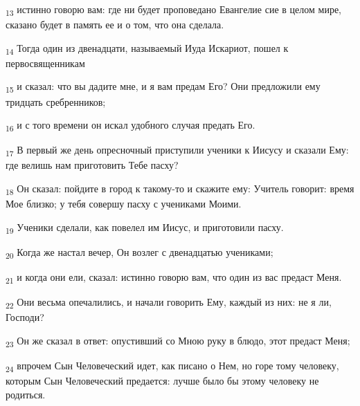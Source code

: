 \begin{tcolorbox}
\textsubscript{13} истинно говорю вам: где ни будет проповедано Евангелие сие в целом мире, сказано будет в память ее и о том, что она сделала.
\end{tcolorbox}
\begin{tcolorbox}
\textsubscript{14} Тогда один из двенадцати, называемый Иуда Искариот, пошел к первосвященникам
\end{tcolorbox}
\begin{tcolorbox}
\textsubscript{15} и сказал: что вы дадите мне, и я вам предам Его? Они предложили ему тридцать сребренников;
\end{tcolorbox}
\begin{tcolorbox}
\textsubscript{16} и с того времени он искал удобного случая предать Его.
\end{tcolorbox}
\begin{tcolorbox}
\textsubscript{17} В первый же день опресночный приступили ученики к Иисусу и сказали Ему: где велишь нам приготовить Тебе пасху?
\end{tcolorbox}
\begin{tcolorbox}
\textsubscript{18} Он сказал: пойдите в город к такому-то и скажите ему: Учитель говорит: время Мое близко; у тебя совершу пасху с учениками Моими.
\end{tcolorbox}
\begin{tcolorbox}
\textsubscript{19} Ученики сделали, как повелел им Иисус, и приготовили пасху.
\end{tcolorbox}
\begin{tcolorbox}
\textsubscript{20} Когда же настал вечер, Он возлег с двенадцатью учениками;
\end{tcolorbox}
\begin{tcolorbox}
\textsubscript{21} и когда они ели, сказал: истинно говорю вам, что один из вас предаст Меня.
\end{tcolorbox}
\begin{tcolorbox}
\textsubscript{22} Они весьма опечалились, и начали говорить Ему, каждый из них: не я ли, Господи?
\end{tcolorbox}
\begin{tcolorbox}
\textsubscript{23} Он же сказал в ответ: опустивший со Мною руку в блюдо, этот предаст Меня;
\end{tcolorbox}
\begin{tcolorbox}
\textsubscript{24} впрочем Сын Человеческий идет, как писано о Нем, но горе тому человеку, которым Сын Человеческий предается: лучше было бы этому человеку не родиться.
\end{tcolorbox}
